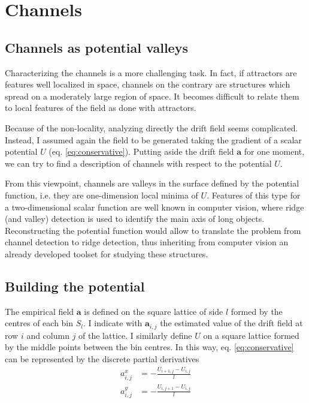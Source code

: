 \documentclass[a4paper]{article}
\begin{document}
\section{Channels}

\subsection{Channels as potential valleys}

Characterizing the channels is a more challenging task. In fact, if attractors are features well localized in space, channels on the contrary are structures which spread on a moderately large region of space. It becomes difficult to relate them to local features of the field as done with attractors.

Because of the non-locality, analyzing directly the drift field seems complicated. Instead, I assumed again the field to be generated taking the gradient of a scalar potential $U$ (eq. \ref{eq:conservative}). Putting aside the drift field $\bm{a}$ for one moment, we can try to find a description of channels with respect to the potential $U$.

From this viewpoint, channels are valleys in the surface defined by the potential function, i.e. they are one-dimension local minima of $U$. Features of this type for a two-dimensional scalar function are well known in computer vision, where ridge (and valley) detection is used to identify the main axis of long objects. Reconstructing the potential function would allow to translate the problem from channel detection to ridge detection, thus inheriting from computer vision an already developed toolset for studying these structures.

\subsection{Building the potential}

The empirical field $\bm{a}$ is defined on the square lattice of side $l$ formed by the centres of each bin $S_l$. I indicate with $\bm{a}_{i,j}$ the estimated value of the drift field at row $i$ and column $j$ of the lattice. I similarly define $U$ on a square lattice formed by the middle points between the bin centres. In this way, eq. \ref{eq:conservative} can be represented by the discrete partial derivatives
\begin{align}
a^x_{i,j} &= - \frac{U_{i+1,j} - U_{i,j}}{l} \\[10pt]
a^y_{i,j} &= - \frac{U_{i,j+1} - U_{i,j}}{l}
\end{align}
\end{document}
